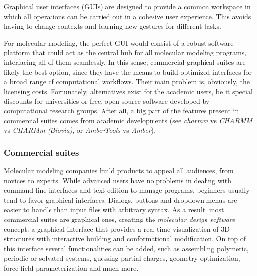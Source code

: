Graphical user interfaces (GUIs) are designed to provide a common workspace in which all  operations can be carried out in a cohesive user experience. This avoids having to change contexts and learning new gestures for different tasks.

For molecular modeling, the perfect GUI would consist of a robust software platform that could act as the central hub for all molecular modeling programs, interfacing all of them seamlessly. In this sense, commercial graphical suites are likely the best option, since they have the means to build optimized interfaces for a broad range of computational workflows. Their main problem is, obviously, the licensing costs. Fortunately, alternatives exist for the academic users, be it special discounts for universities or free, open-source software developed by computational research groups. After all, a big part of the features present in commercial suites comes from academic developments (see \textit{charmm} vs \textit{CHARMM} vs \textit{CHARMm (Biovia)}, or \textit{AmberTools} vs \textit{Amber}).

\subsubsection{Commercial suites}
Molecular modeling companies build products to appeal all audiences, from novices to experts. While advanced users have no problems in dealing with command line interfaces and text edition to manage programs, beginners usually tend to favor graphical interfaces. Dialogs, buttons and dropdown menus are easier to handle than input files with arbitrary syntax. As a result, most commercial suites are graphical ones, creating the \textit{molecular design software} concept: a graphical interface that provides a real-time visualization of 3D structures with interactive building and conformational modification. On top of this interface several functionalities can be added, such as assembling polymeric, periodic or solvated systems, guessing partial charges, geometry optimization, force field parameterization and much more.

